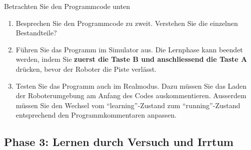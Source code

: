 \begin{myexercise}
    Betrachten Sie den Programmcode unten

    \begin{enumerate}
        \item Besprechen Sie den Programmcode zu zweit.
              Verstehen Sie die einzelnen Bestandteile?

        \item Führen Sie das Programm im Simulator aus.
              Die Lernphase kann beendet werden, indem Sie
              \textbf{zuerst die Taste B und anschliessend
                  die Taste A} drücken, bevor der Roboter
              die Piste verlässt.

        \item Testen Sie das Programm auch im Realmodus. Dazu müssen Sie das Laden der Roboterumgebung am Anfang des Codes auskommentieren. Ausserdem müssen Sie den Wechsel vom \enquote{learning}-Zustand zum \enquote{running}-Zustand entsprechend den Programmkommentaren anpassen.
    \end{enumerate}
\end{myexercise}











\subsection{Phase 3: Lernen durch Versuch und Irrtum}

